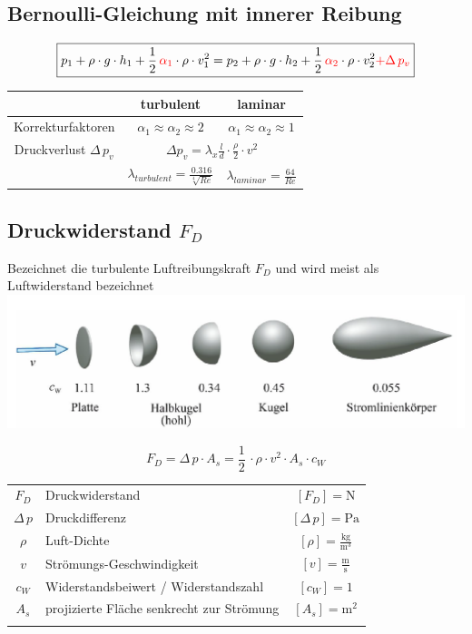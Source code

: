 



\subsection{Bernoulli-Gleichung mit innerer Reibung}

$$ \boxed{  p_1 +  \rho \cdot g \cdot h_1 + \frac{1}{2} \, \textcolor{red}{\alpha_1} \cdot \rho \cdot v_1^2 = p_2 +  \rho \cdot g \cdot h_2 + \frac{1}{2} \, \textcolor{red}{\alpha_2} \cdot \rho \cdot v_2^2 \textcolor{red}{+ \Delta \, p_v}  }$$

\begin{tabular}{c| c |c}
 & turbulent & laminar \\ 
\hline 
Korrekturfaktoren & $\alpha_1 \approx \alpha_2 \approx 2$  & $\alpha_1 \approx \alpha_2 \approx 1$ \\ 
\hline 
\rule{0pt}{11pt} Druckverlust $\Delta \, p_v$ & \multicolumn{2}{c}{$\Delta p_v = \lambda_x \frac{l}{d} \cdot \frac{\rho}{2} \cdot v^2$} \\ 
\hline 
\rule{0pt}{11pt}  & $\lambda_{turbulent} = \frac{0.316}{\sqrt[4]{Re}}  $ & $\lambda_{laminar} = \frac{64}{Re} $  \\ 
\end{tabular} 



\subsection{Druckwiderstand $F_D$}
Bezeichnet die turbulente Luftreibungskraft $F_D$ und wird meist als Luftwiderstand bezeichnet \\

\includegraphics[width=0.8\linewidth]{Bilder/widerstandsbeiwert.png}

$$ \boxed{ F_D = \Delta \, p \cdot A_s = \frac{1}{2} \, \cdot \rho \cdot v^2 \cdot A_s \cdot c_W } $$


\begin{tabular}{c l c}
		$F_D$ & Druckwiderstand & $[F_D] = \mathrm{N}$ \\
		$\Delta \, p$ & Druckdifferenz & $[\Delta \, p] = \mathrm{Pa}$  \\
		\rule{0pt}{8pt}$\rho$ & Luft-Dichte & $[\rho] = \mathrm{\frac{kg}{m^3}}$ \\
		\rule{0pt}{8pt}$v$ & Strömungs-Geschwindigkeit & $[v] = \mathrm{\frac{m}{s}}$ \\
		$c_W$ & Widerstandsbeiwert / Widerstandszahl & $[c_W] = 1$\\
		$A_s$ & projizierte Fläche senkrecht zur Strömung & $[A_s] = \mathrm{m^2}$ \\
		\\
\end{tabular}

